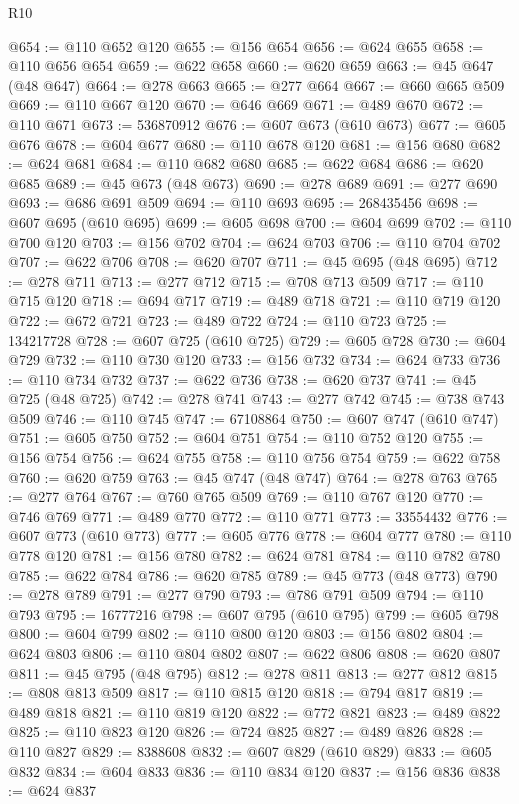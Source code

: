\begin{lexlean}{R10}
\begin{coremodule}
@654 := @110 @652 @120
@655 := @156 @654
@656 := @624 @655
@658 := @110 @656 @654
@659 := @622 @658
@660 := @620 @659
@663 := @45 @647 (@48 @647)
@664 := @278 @663
@665 := @277 @664
@667 := @660 @665 @509
@669 := @110 @667 @120
@670 := @646 @669
@671 := @489 @670
@672 := @110 @671
@673 := 536870912
@676 := @607 @673 (@610 @673)
@677 := @605 @676
@678 := @604 @677
@680 := @110 @678 @120
@681 := @156 @680
@682 := @624 @681
@684 := @110 @682 @680
@685 := @622 @684
@686 := @620 @685
@689 := @45 @673 (@48 @673)
@690 := @278 @689
@691 := @277 @690
@693 := @686 @691 @509
@694 := @110 @693
@695 := 268435456
@698 := @607 @695 (@610 @695)
@699 := @605 @698
@700 := @604 @699
@702 := @110 @700 @120
@703 := @156 @702
@704 := @624 @703
@706 := @110 @704 @702
@707 := @622 @706
@708 := @620 @707
@711 := @45 @695 (@48 @695)
@712 := @278 @711
@713 := @277 @712
@715 := @708 @713 @509
@717 := @110 @715 @120
@718 := @694 @717
@719 := @489 @718
@721 := @110 @719 @120
@722 := @672 @721
@723 := @489 @722
@724 := @110 @723
@725 := 134217728
@728 := @607 @725 (@610 @725)
@729 := @605 @728
@730 := @604 @729
@732 := @110 @730 @120
@733 := @156 @732
@734 := @624 @733
@736 := @110 @734 @732
@737 := @622 @736
@738 := @620 @737
@741 := @45 @725 (@48 @725)
@742 := @278 @741
@743 := @277 @742
@745 := @738 @743 @509
@746 := @110 @745
@747 := 67108864
@750 := @607 @747 (@610 @747)
@751 := @605 @750
@752 := @604 @751
@754 := @110 @752 @120
@755 := @156 @754
@756 := @624 @755
@758 := @110 @756 @754
@759 := @622 @758
@760 := @620 @759
@763 := @45 @747 (@48 @747)
@764 := @278 @763
@765 := @277 @764
@767 := @760 @765 @509
@769 := @110 @767 @120
@770 := @746 @769
@771 := @489 @770
@772 := @110 @771
@773 := 33554432
@776 := @607 @773 (@610 @773)
@777 := @605 @776
@778 := @604 @777
@780 := @110 @778 @120
@781 := @156 @780
@782 := @624 @781
@784 := @110 @782 @780
@785 := @622 @784
@786 := @620 @785
@789 := @45 @773 (@48 @773)
@790 := @278 @789
@791 := @277 @790
@793 := @786 @791 @509
@794 := @110 @793
@795 := 16777216
@798 := @607 @795 (@610 @795)
@799 := @605 @798
@800 := @604 @799
@802 := @110 @800 @120
@803 := @156 @802
@804 := @624 @803
@806 := @110 @804 @802
@807 := @622 @806
@808 := @620 @807
@811 := @45 @795 (@48 @795)
@812 := @278 @811
@813 := @277 @812
@815 := @808 @813 @509
@817 := @110 @815 @120
@818 := @794 @817
@819 := @489 @818
@821 := @110 @819 @120
@822 := @772 @821
@823 := @489 @822
@825 := @110 @823 @120
@826 := @724 @825
@827 := @489 @826
@828 := @110 @827
@829 := 8388608
@832 := @607 @829 (@610 @829)
@833 := @605 @832
@834 := @604 @833
@836 := @110 @834 @120
@837 := @156 @836
@838 := @624 @837

\end{coremodule}
\end{lexlean}
